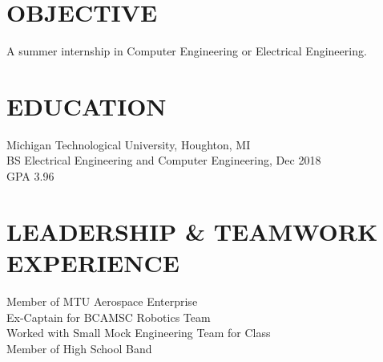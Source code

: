 \documentclass[letterpaper]{res}
\begin{document}
 


\address{\bf  PRESENT ADDRESS \\ 51280 Blue Top Cabin Rd \\ Houghton, MI 49931}
\address{\\ jaevanko@mtu.edu \\ (269) 262-6098}
\address{\bf PERMANENT ADDRESS \\ 14200 Stone Jug Road \\  Battle Creek, MI 49015}

\begin{resume}

  \section{OBJECTIVE}          
  A summer internship in Computer Engineering or Electrical Engineering.          

  \section{EDUCATION}          
  Michigan Technological University, Houghton, MI  \\        
  BS Electrical Engineering and Computer Engineering, Dec 2018   \\      
  GPA 3.96

  \section{LEADERSHIP \& TEAMWORK EXPERIENCE}
  Member of MTU Aerospace Enterprise \\
  Ex-Captain for BCAMSC Robotics Team \\
  Worked with Small Mock Engineering Team for Class \\
  Member of High School Band



\end{resume}
\end{document}
